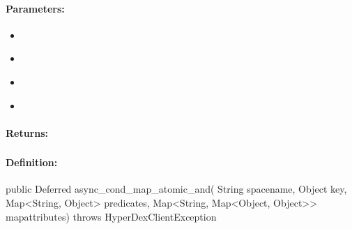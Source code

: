 \paragraph{Parameters:}
\begin{itemize}[noitemsep]
\item {}\\

\item {}\\

\item {}\\

\item {}\\

\end{itemize}

\paragraph{Returns:}


\pagebreak
\subsubsection{}
\label{api:java:async_cond_map_atomic_and}


\paragraph{Definition:}
\begin{javacode}
public Deferred async_cond_map_atomic_and(
        String spacename,
        Object key,
        Map<String, Object> predicates,
        Map<String, Map<Object, Object>> mapattributes) throws HyperDexClientException
\end{javacode}

